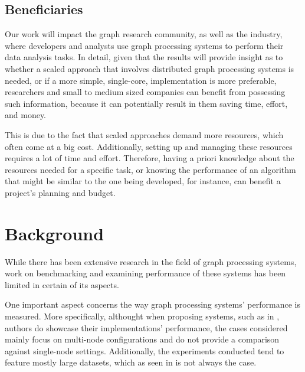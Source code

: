 \documentclass[a4paper,11pt]{article}
\begin{document}

\subsection{Beneficiaries}

\par Our work will impact the graph research community, as well as the industry, where developers and analysts use graph processing systems to perform their data analysis tasks. In detail, given that the results will provide insight as to whether a scaled approach that involves distributed graph processing systems is needed, or if a more simple, single-core, implementation is more preferable, researchers and small to medium sized companies can benefit from possessing such information, because it can potentially result in them saving time, effort, and money. 

\par This is due to the fact that scaled approaches demand more resources, which often come at a big cost. Additionally, setting up and managing these resources requires a lot of time and effort. Therefore, having a priori knowledge about the resources needed for a specific task, or knowing the performance of an algorithm that might be similar to the one being developed, for instance, can benefit a project's planning and budget.





\section{Background} \label{background}

\par While there has been extensive research in the field of graph processing systems, work on benchmarking and examining performance of these systems has been limited in certain of its aspects. 

\par One important aspect concerns the way graph processing systems' performance is measured. More specifically, althought when proposing systems, such as in \cite{pregel,graphxpaper, powergraph}, authors do showcase their implementations' performance, the cases considered mainly focus on multi-node configurations and do not provide a comparison against single-node settings. Additionally, the experiments conducted tend to feature mostly large datasets, which as seen in \cite{survey} is not always the case.
\end{document}
